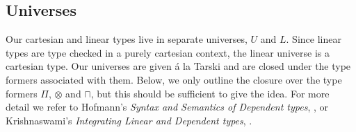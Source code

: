 \subsection{Universes}
Our cartesian and linear types live in separate universes, $U$ and $L$. Since linear types are type checked in a purely cartesian context, the linear universe is a cartesian type. Our universes are given á la Tarski and are closed under the type formers associated with them. Below, we only outline the closure over the type formers $\Pi$, $\otimes$ and $\sqcap$, but this should be sufficient to give the idea. For more detail we refer to Hofmann's \textit{Syntax and Semantics of Dependent types}, \cite{hofmann1997syntax}, or Krishnaswami's \textit{Integrating Linear and Dependent types}, \cite{krishnaswami}.\\
\\
